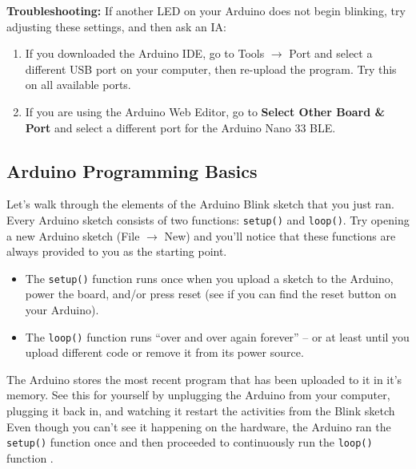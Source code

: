 \documentclass[12pt]{article}
\begin{document}
\begin{enumerate}
    \textbf{ Troubleshooting:} If another LED on your Arduino does not begin blinking, try adjusting these settings, and then ask an IA:
    
    \begin{enumerate}
        \item If you downloaded the Arduino IDE, go to Tools $\rightarrow$ Port and select a different USB port on your computer, then re-upload the program. Try this on all available ports.
        \item If you are using the Arduino Web Editor, go to \textbf{Select Other Board \& Port} and select a different port for the Arduino Nano 33 BLE.
    	   \end{enumerate}
	   
    \end{enumerate}
        
    \subsection*{Arduino Programming Basics}
    Let's walk through the elements of the Arduino Blink sketch that you just ran. Every Arduino sketch consists of two functions: \verb|setup()| and \verb|loop()|. Try opening a new Arduino sketch (File $\rightarrow$ New) and you’ll notice that these functions are always provided to you as the starting point. 
        
    \begin{itemize}
    \item The \verb|setup()| function runs once when you upload a sketch to the Arduino, power the board, and/or press reset (see if you can find the reset button on your Arduino).
        
            \item The \verb|loop()| function runs “over and over again forever” – or at least until you upload different code or remove it from its power source.
        \end{itemize}

        The Arduino stores the most recent program that has been uploaded to it in it’s memory. See this for yourself by unplugging the Arduino from your computer, plugging it back in, and watching it restart the activities from the Blink sketch Even though you can't see it happening on the hardware, the Arduino ran the \verb|setup()| function once and then proceeded to continuously run the \verb|loop()| function .\newline
        
\end{document}
